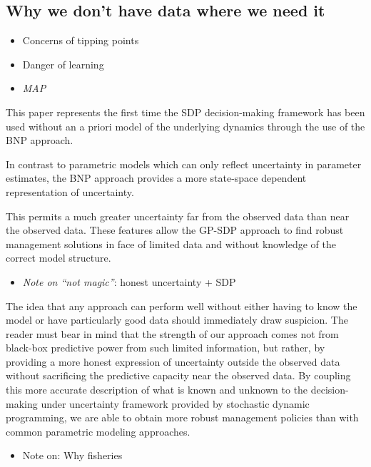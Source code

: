 \documentclass[author-year, review]{elsarticle} %
\begin{document}
\subsection{Why we don't have data where we need
it}\label{why-we-dont-have-data-where-we-need-it}

\begin{itemize}
\item
  Concerns of tipping points
\item
  Danger of learning
\item
  \emph{MAP}
\end{itemize}

This paper represents the first time the SDP decision-making framework
has been used without an a priori model of the underlying dynamics
through the use of the BNP approach.

In contrast to parametric models which can only reflect uncertainty in
parameter estimates, the BNP approach provides a more state-space
dependent representation of uncertainty.

This permits a much greater uncertainty far from the observed data than
near the observed data. These features allow the GP-SDP approach to find
robust management solutions in face of limited data and without
knowledge of the correct model structure.

\begin{itemize}
\itemsep1pt\parskip0pt
\item
  \emph{Note on ``not magic''}: honest uncertainty + SDP
\end{itemize}

The idea that any approach can perform well without either having to
know the model or have particularly good data should immediately draw
suspicion. The reader must bear in mind that the strength of our
approach comes not from black-box predictive power from such limited
information, but rather, by providing a more honest expression of
uncertainty outside the observed data without sacrificing the predictive
capacity near the observed data. By coupling this more accurate
description of what is known and unknown to the decision-making under
uncertainty framework provided by stochastic dynamic programming, we are
able to obtain more robust management policies than with common
parametric modeling approaches.

\begin{itemize}
\itemsep1pt\parskip0pt
\item
  Note on: Why fisheries
\end{itemize}
\end{document}
